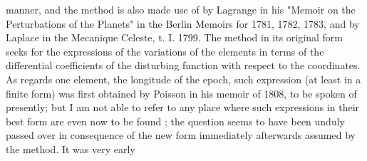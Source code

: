 \documentclass[11pt,a4paper]{book}
\begin{document}
manner, and the method is also made use of by Lagrange in his "Memoir on the
Perturbations of the Planets" in the Berlin Memoirs for 1781, 1782, 1783, and by
Laplace in the Mecanique Celeste, t. I. 1799. The method in its original form
seeks for the expressions of the variations of the elements in terms of the differential
coefficients of the disturbing function with respect to the coordinates. As regards one
element, the longitude of the epoch, such expression (at least in a finite form) was
first obtained by Poisson in his memoir of 1808, to be spoken of presently; but I
am not able to refer to any place where such expressions in their best form are even
now to be found ; the question seems to have been unduly passed over in consequence
of the new form immediately afterwards assumed by the method. It was very early


\end{document}
